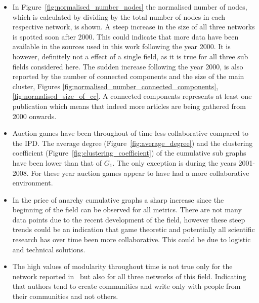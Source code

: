 \documentclass{article}
\theoremstyle{definition}
\begin{document}
\begin{itemize}
    \item In Figure~\ref{fig:normalised_number_nodes} the normalised number of nodes,
    which is calculated by dividing by the total number of nodes in each respective network,
    is shown. A steep increase in the size of all three networks is spotted soon after
    2000. This could indicate that more data have been available in the sources
    used in this work following the year 2000. It is however, definitely not a effect
    of a single field, as it is true for all three sub fields considered here.
    The sudden increase following the year 2000, is also reported by the
    number of connected components and the size of the main cluster, Figures
    \ref{fig:normalised_number_connected_components}, \ref{fig:normalised_size_of_cc}.
    A connected components represents at least one publication which means that indeed
    more articles are being gathered from 2000 onwards.
    \item Auction games have been throughout of time less collaborative compared
    to the IPD. The average degree (Figure~\ref{fig:average_degree})
    and the clustering coefficient (Figure~\ref{fig:clustering_coefficient}) of 
    the cumulative sub graphs have been lower than that of \(G_1\).
    The only exception is during the years 2001-2008. For these
    year auction games appear to have had a more collaborative environment.
    \item In the price of anarchy cumulative graphs a sharp increase since the 
    beginning of the field can be observed for all metrics. There are not
    many data points due to the recent development of the field, however
    these steep trends could be an indication that game theoretic and potentially
    all scientific research has over time been more collaborative. This could
    be due to logistic and technical solutions.
    \item The high values of modularity throughout time is not true only for the
    network reported in~\cite{Liu2015} but also for all three networks of this
    field. Indicating that authors tend to create communities and write only
    with people from their communities and not others.
\end{itemize}
\end{document}

